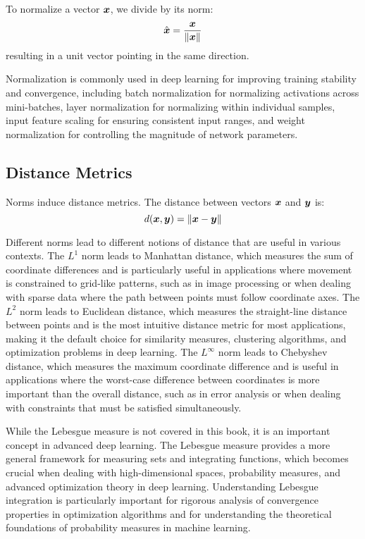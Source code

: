 \begin{definition}[Normalization]
To normalize a vector $\boldsymbol{x}$, we divide by its norm:
\begin{equation}
    \hat{\boldsymbol{x}} = \frac{\boldsymbol{x}}{\left\lVert\boldsymbol{x}\right\rVert}
\end{equation}
resulting in a unit vector pointing in the same direction.
\end{definition}

Normalization is commonly used in deep learning for improving training stability and convergence, including batch normalization for normalizing activations across mini-batches, layer normalization for normalizing within individual samples, input feature scaling for ensuring consistent input ranges, and weight normalization for controlling the magnitude of network parameters.

\subsection{Distance Metrics}

Norms induce distance metrics. The distance between vectors $\boldsymbol{x}$ and $\boldsymbol{y}$ is:
\begin{equation}
    d(\boldsymbol{x}, \boldsymbol{y}) = \left\lVert\boldsymbol{x} - \boldsymbol{y}\right\rVert
\end{equation}

Different norms lead to different notions of distance that are useful in various contexts. The $L^1$ norm leads to Manhattan distance, which measures the sum of coordinate differences and is particularly useful in applications where movement is constrained to grid-like patterns, such as in image processing or when dealing with sparse data where the path between points must follow coordinate axes. The $L^2$ norm leads to Euclidean distance, which measures the straight-line distance between points and is the most intuitive distance metric for most applications, making it the default choice for similarity measures, clustering algorithms, and optimization problems in deep learning. The $L^\infty$ norm leads to Chebyshev distance, which measures the maximum coordinate difference and is useful in applications where the worst-case difference between coordinates is more important than the overall distance, such as in error analysis or when dealing with constraints that must be satisfied simultaneously.

\begin{remark}
While the Lebesgue measure is not covered in this book, it is an important concept in advanced deep learning. The Lebesgue measure provides a more general framework for measuring sets and integrating functions, which becomes crucial when dealing with high-dimensional spaces, probability measures, and advanced optimization theory in deep learning. Understanding Lebesgue integration is particularly important for rigorous analysis of convergence properties in optimization algorithms and for understanding the theoretical foundations of probability measures in machine learning.
\end{remark}

